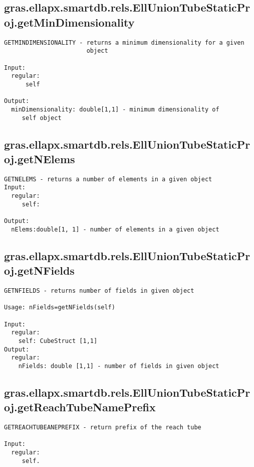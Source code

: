 \subsection{\texorpdfstring{gras.ellapx.smartdb.rels.EllUnionTubeStaticProj.getMinDimensionality}{getMinDimensionality}}\label{method:gras.ellapx.smartdb.rels.EllUnionTubeStaticProj.getMinDimensionality}
\begin{verbatim}
GETMINDIMENSIONALITY - returns a minimum dimensionality for a given
                       object

Input:
  regular:
      self

Output:
  minDimensionality: double[1,1] - minimum dimensionality of
     self object
\end{verbatim}
\subsection{\texorpdfstring{gras.ellapx.smartdb.rels.EllUnionTubeStaticProj.getNElems}{getNElems}}\label{method:gras.ellapx.smartdb.rels.EllUnionTubeStaticProj.getNElems}
\begin{verbatim}
GETNELEMS - returns a number of elements in a given object
Input:
  regular:
     self:

Output:
  nElems:double[1, 1] - number of elements in a given object
\end{verbatim}
\subsection{\texorpdfstring{gras.ellapx.smartdb.rels.EllUnionTubeStaticProj.getNFields}{getNFields}}\label{method:gras.ellapx.smartdb.rels.EllUnionTubeStaticProj.getNFields}
\begin{verbatim}
GETNFIELDS - returns number of fields in given object

Usage: nFields=getNFields(self)

Input:
  regular:
    self: CubeStruct [1,1]
Output:
  regular:
    nFields: double [1,1] - number of fields in given object
\end{verbatim}
\subsection{\texorpdfstring{gras.ellapx.smartdb.rels.EllUnionTubeStaticProj.getReachTubeNamePrefix}{getReachTubeNamePrefix}}\label{method:gras.ellapx.smartdb.rels.EllUnionTubeStaticProj.getReachTubeNamePrefix}
\begin{verbatim}
GETREACHTUBEANEPREFIX - return prefix of the reach tube

Input:
  regular:
     self.
\end{verbatim}

